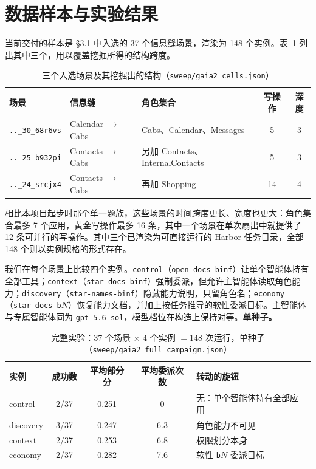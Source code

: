 \documentclass[UTF8,11pt,fontset=fandol]{ctexart}
\begin{document}
\section{数据样本与实验结果}

当前交付的样本是 \S3.1 中入选的 37 个信息缝场景，渲染为 148 个实例。表~\ref{tab:samples} 列出其中三个，用以覆盖挖掘所得的结构跨度。

\begin{table}[H]
\centering
\small
\caption{三个入选场景及其挖掘出的结构（\texttt{sweep/gaia2\_cells.json}）}
\label{tab:samples}
\begin{tabularx}{\textwidth}{>{\raggedright\arraybackslash}p{2.7cm} >{\raggedright\arraybackslash}p{2.7cm} X c c}
\toprule
场景 & 信息缝 & 角色集合 & 写操作 & 深度\\
\midrule
\texttt{..\_30\_68r6vs} & Calendar $\rightarrow$ Cabs & Cabs、Calendar、Messages & 5 & 3\\
\texttt{..\_25\_b932pi} & Contacts $\rightarrow$ Cabs & 另加 Contacts、InternalContacts & 5 & 3\\
\texttt{..\_24\_srcjx4} & Contacts $\rightarrow$ Cabs & 再加 Shopping & 14 & 4\\
\bottomrule
\end{tabularx}
\end{table}

相比本项目起步时那个单一题族，这些场景的时间跨度更长、宽度也更大：角色集合最多 7 个应用，黄金写操作最多 16 条，其中一个场景在单次扇出中就提供了 12 条可并行的写操作。其中三个已渲染为可直接运行的 Harbor 任务目录，全部 148 个则以实例规格的形式存在。

我们在每个场景上比较四个实例。\texttt{control}（\texttt{open-docs-binf}）让单个智能体持有全部工具；\texttt{context}（\texttt{star-docs-binf}）强制委派，但允许主智能体读取角色能力；\texttt{discovery}（\texttt{star-names-binf}）隐藏能力说明，只留角色名；\texttt{economy}（\texttt{star-docs-b}$N$）恢复能力文档，并加上按任务推导的软性委派目标。主智能体与专属智能体同为 \texttt{gpt-5.6-sol}，模型档位在构造上保持对等。\textbf{单种子。}

\begin{table}[H]
\centering
\small
\caption{完整实验：37 个场景 $\times$ 4 个实例 $=148$ 次运行，单种子（\texttt{sweep/gaia2\_full\_campaign.json}）}
\label{tab:results}
\begin{tabularx}{\textwidth}{>{\raggedright\arraybackslash}p{2.2cm} c c c X}
\toprule
实例 & 成功数 & 平均部分分 & 平均委派次数 & 转动的旋钮\\
\midrule
control & 2/37 & 0.251 & 0 & 无：单个智能体持有全部应用\\
discovery & 3/37 & 0.247 & 6.3 & 角色能力不可见\\
context & 2/37 & 0.253 & 6.8 & 权限划分本身\\
economy & 2/37 & 0.282 & 7.6 & 软性 \texttt{b}$N$ 委派目标\\
\bottomrule
\end{tabularx}
\end{table}
\end{document}
